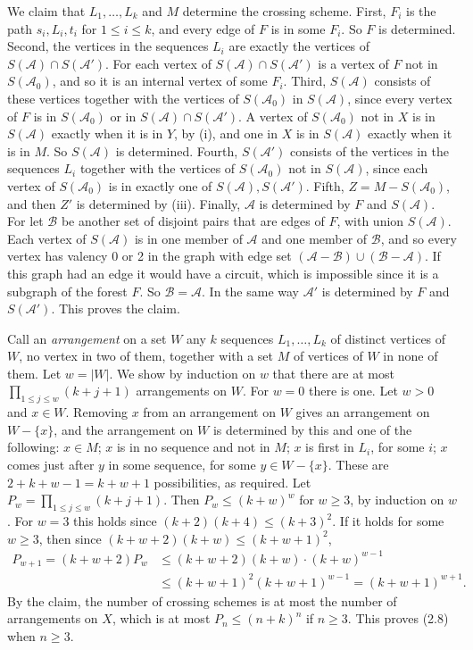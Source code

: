 {We claim that $L_1, \dots, L_k$ and $M$ determine the crossing scheme. First, $F_i$ is the path
$s_i, L_i, t_i$ for $1 \le i \le k$, and every edge of $F$ is in some $F_i$. So $F$ is determined.
Second, the vertices in the sequences $L_i$ are exactly the vertices of
$S(\mathscr{A}) \cap S(\mathscr{A}')$. For each vertex of $S(\mathscr{A}) \cap S(\mathscr{A}')$ is a
vertex of $F$ not in $S(\mathscr{A}_0)$, and so it is an internal vertex of some $F_i$. Third,
$S(\mathscr{A})$ consists of these vertices together with the vertices of $S(\mathscr{A}_0)$ in
$S(\mathscr{A})$, since every vertex of $F$ is in $S(\mathscr{A}_0)$ or in
$S(\mathscr{A}) \cap S(\mathscr{A}')$. A vertex of $S(\mathscr{A}_0)$ not in $X$ is in
$S(\mathscr{A})$ exactly when it is in $Y$, by (i), and one in $X$ is in $S(\mathscr{A})$ exactly when
it is in $M$. So $S(\mathscr{A})$ is determined. Fourth, $S(\mathscr{A}')$ consists of the vertices in
the sequences $L_i$ together with the vertices of $S(\mathscr{A}_0)$ not in $S(\mathscr{A})$, since
each vertex of $S(\mathscr{A}_0)$ is in exactly one of $S(\mathscr{A}), S(\mathscr{A}')$. Fifth,
$Z = M - S(\mathscr{A}_0)$, and then $Z'$ is determined by (iii). Finally, $\mathscr{A}$ is
determined by $F$ and $S(\mathscr{A})$. For let $\mathscr{B}$ be another set of disjoint pairs
that are edges of $F$, with union $S(\mathscr{A})$. Each vertex of $S(\mathscr{A})$ is in one member
of $\mathscr{A}$ and one member of $\mathscr{B}$, and so every vertex has valency 0 or 2 in the graph
with edge set $(\mathscr{A} - \mathscr{B}) \cup (\mathscr{B} - \mathscr{A})$. If this graph had an
edge it would have a circuit, which is impossible since it is a subgraph of the forest $F$. So
$\mathscr{B} = \mathscr{A}$. In the same way $\mathscr{A}'$ is determined by $F$ and
$S(\mathscr{A}')$. This proves the claim.

Call an \textit{arrangement} on a set $W$ any $k$ sequences $L_1, \dots, L_k$ of distinct vertices of
$W$, no vertex in two of them, together with a set $M$ of vertices of $W$ in none of them. Let
$w = |W|$. We show by induction on $w$ that there are at most $\prod_{1 \le j \le w} (k+j+1)$
arrangements on $W$. For $w = 0$ there is one. Let $w > 0$ and $x \in W$. Removing $x$ from an
arrangement on $W$ gives an arrangement on $W - \{x\}$, and the arrangement on $W$ is determined by
this and one of the following: $x \in M$; $x$ is in no sequence and not in $M$; $x$ is first in
$L_i$, for some $i$; $x$ comes just after $y$ in some sequence, for some $y \in W - \{x\}$. These are
$2 + k + w - 1 = k + w + 1$ possibilities, as required. Let $P_w = \prod_{1 \le j \le w} (k+j+1)$.
Then $P_w \le (k+w)^w$ for $w \ge 3$, by induction on $w$. For $w = 3$ this holds since
$(k+2)(k+4) \le (k+3)^2$. If it holds for some $w \ge 3$, then since $(k+w+2)(k+w) \le (k+w+1)^2$,
\begin{align*}
P_{w+1} = (k+w+2) P_w &\le (k+w+2)(k+w) \cdot (k+w)^{w-1}\\
&\le (k+w+1)^2 (k+w+1)^{w-1} = (k+w+1)^{w+1}.
\end{align*}
By the claim, the number of crossing schemes is at most the number of arrangements on $X$, which is
at most $P_n \le (n+k)^n$ if $n \ge 3$. This proves (2.8) when $n \ge 3$.

}
